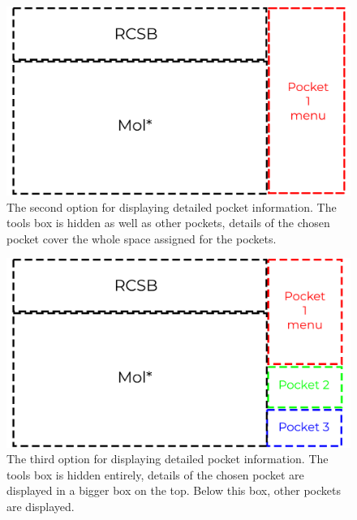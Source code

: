 \begin{figure}[htb]
	\centering
	\includegraphics[width=\linewidth]{img/dialog_2-svg.pdf}
	\caption{The second option for displaying detailed pocket information. The tools box is hidden as well as other pockets, details of the chosen pocket cover the whole space assigned for the pockets.}
	\label{fig:dialog-2}
\end{figure}

\begin{figure}[htb]
	\centering
	\includegraphics[width=\linewidth]{img/dialog_3-svg.pdf}
	\caption{The third option for displaying detailed pocket information. The tools box is hidden entirely, details of the chosen pocket are displayed in a bigger box on the top. Below this box, other pockets are displayed.}
	\label{fig:dialog-3}
\end{figure}

